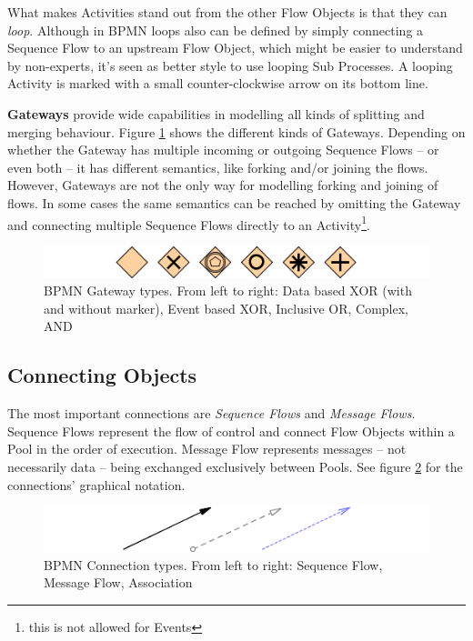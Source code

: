 What makes Activities stand out from the other Flow Objects is that they can
\emph{loop}.  Although in BPMN loops also can be defined by simply connecting a
Sequence Flow to an upstream Flow Object, which might be easier to understand by
non-experts, it's seen as better style to use looping Sub Processes.  A looping
Activity is marked with a small counter-clockwise arrow on its bottom line.

\textbf{Gateways} provide wide capabilities in modelling all kinds of splitting
and merging behaviour.  Figure \ref{fig:gateways} shows the different kinds of
Gateways.  Depending on whether the Gateway has multiple incoming or outgoing
Sequence Flows -- or even both -- it has different semantics, like forking and/or
joining the flows.  However, Gateways are not the only way for modelling forking
and joining of flows.  In some cases the same semantics can be reached by omitting
the Gateway and connecting multiple Sequence Flows directly to an
Activity\footnote{this is not allowed for Events}.

\begin{figure}[ht]
	\centering
	\includegraphics[width=.75\textwidth]{figures/bpmn/gateways.png}
	\caption[BPMN Gateway types]{BPMN Gateway types.  From left to right: Data
	based XOR (with and without marker), Event based XOR, Inclusive OR, Complex,
	AND}
	\label{fig:gateways}
\end{figure}


\subsection{Connecting Objects}

The most important connections are \emph{Sequence Flows} and \emph{Message Flows}.
Sequence Flows represent the flow of control and connect Flow Objects within a
Pool in the order of execution.  Message Flow represents messages -- not necessarily
data -- being exchanged exclusively between Pools.  See figure \ref{fig:connections}
for the connections' graphical notation.

\begin{figure}[ht]
	\centering
	\includegraphics[width=.75\textwidth]{figures/bpmn/connections.png}
	\caption[BPMN Connection types]{BPMN Connection types.  From left to right:
	Sequence Flow, Message Flow, Association}
	\label{fig:connections}
\end{figure}

